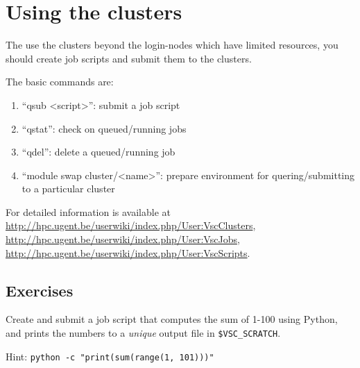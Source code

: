 \chapter{Using the clusters}

The use the clusters beyond the \glspl{login-node} which have limited resources, you
should create job scripts and submit them to the clusters.

The basic commands are:

\begin{enumerate}
 \item``qsub <script>'': submit a job script
 \item``qstat'': check on queued/running jobs
 \item``qdel'': delete a queued/running job
 \item``module swap cluster/<name>'': prepare environment for quering/submitting to a particular cluster
\end{enumerate}

For detailed information is available at
\url{http://hpc.ugent.be/userwiki/index.php/User:VscClusters},
\url{http://hpc.ugent.be/userwiki/index.php/User:VscJobs},
\url{http://hpc.ugent.be/userwiki/index.php/User:VscScripts}.

\section{Exercises}

Create and submit a job script that computes the sum of 1-100 using Python, and
prints the numbers to a \emph{unique} output file in \verb|$VSC_SCRATCH|.

Hint: \verb|python -c "print(sum(range(1, 101)))"|
